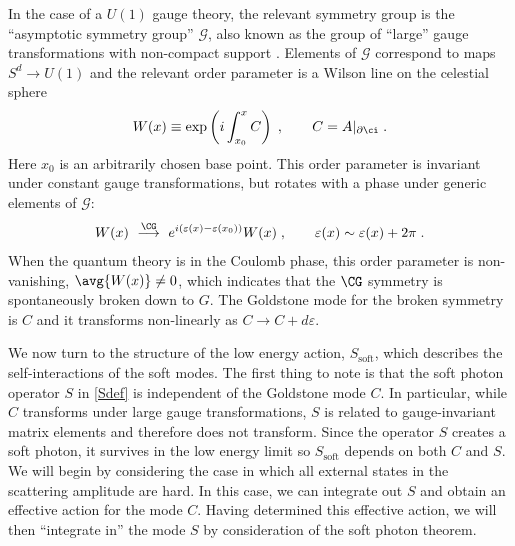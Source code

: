 \documentclass[11pt]{article}
\def\ve{{\varepsilon}}
\def\p{{\partial}}
\begin{document}
In the case of a $U(1)$ gauge theory, the relevant symmetry group is the ``asymptotic symmetry group'' $\mathcal{G}$, also known as the group of ``large'' gauge transformations with non-compact support \cite{He:2014cra, Campiglia:2015qka, Kapec:2014zla, Kapec:2015ena, Campiglia:2018dyi}. Elements of $\mathcal{G}$ correspond to maps $S^{d}\to U(1)$ and the relevant order parameter is a Wilson line on the celestial sphere
\begin{equation}
\begin{split}
W(x) \equiv \exp \left( i \int_{x_0}^{x} C \right) \; , \qquad C = A |_{\p \ci} \; . 
\end{split}
\end{equation}
Here $x_0$ is an arbitrarily chosen base point. This order parameter is invariant under constant gauge transformations, but rotates with a phase under generic elements of $\mathcal{G}$:
\begin{equation}
\begin{split}
W(x) ~ \stackrel{\CG}{\longrightarrow}~ e^{ i ( \ve(x) - \ve(x_0) )} W(x) \;  , \qquad \ve(x) \sim \ve(x) + 2\pi \; .
\end{split}
\end{equation}
When the quantum theory is in the Coulomb phase, this order parameter is non-vanishing, $\avg{ W(x) } \neq 0$, which indicates that the $\CG$ symmetry is spontaneously broken down to $G$. The Goldstone mode for the broken symmetry is $C$ and it transforms non-linearly as $C \to C + d \ve$.

We now turn to the structure of the low energy action, $S_{\text{soft}}$, which describes the self-interactions of the soft modes. The first thing to note is that the soft photon operator $S$ in \eqref{Sdef} is independent of the Goldstone mode $C$. In particular, while $C$ transforms under large gauge transformations, $S$ is related to gauge-invariant matrix elements and therefore does not transform. Since the operator $S$ creates a soft photon, it survives in the low energy limit so $S_{\text{soft}}$ depends on both $C$ and $S$. We will begin by considering the case in which all external states in the scattering amplitude are hard. In this case, we can integrate out $S$ and obtain an effective action for the mode $C$. Having determined this effective action, we will then ``integrate in'' the mode $S$ by consideration of the soft photon theorem. 
\end{document}
